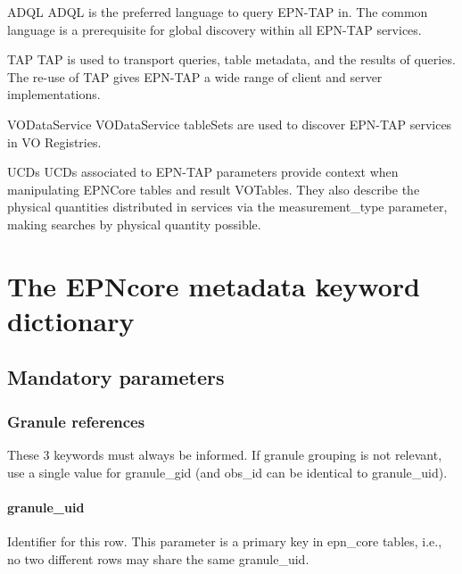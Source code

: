 \documentclass[11pt,a4paper]{ivoa}
\begin{document}
\begin{bigdescription}
\item[ADQL \citep{2008ivoa.spec.1030O}] ADQL is the preferred language to
query EPN-TAP in.  The common language is a prerequisite for global
discovery within all EPN-TAP services.
\item[TAP \citep{2010ivoa.spec.0327D}] TAP is used to transport queries,
table metadata, and the results of queries.  The re-use of TAP gives
EPN-TAP a wide range of client and server implementations.
\item[VODataService \citep{2010ivoa.spec.1202P}] VODataService tableSets
are used to discover EPN-TAP services in VO Registries.
\item[UCDs \citep{2021ivoa.spec.0616C}] UCDs associated to EPN-TAP
parameters provide context when manipulating EPNCore tables and result
VOTables. They also describe the physical quantities distributed in
services via the measurement\_type parameter, making searches by physical
quantity possible.
\end{bigdescription}

\section{The EPNcore metadata keyword dictionary}

\subsection{Mandatory parameters}

\subsubsection{Granule references}

These 3 keywords must always be informed. If granule grouping is not
relevant, use a single value for granule\_gid (and obs\_id can be
identical to granule\_uid).

\paragraph{granule\_uid}

Identifier for this row. This parameter is a primary key in epn\_core
tables, i.e., no two different rows may share the same granule\_uid.
\end{document}

